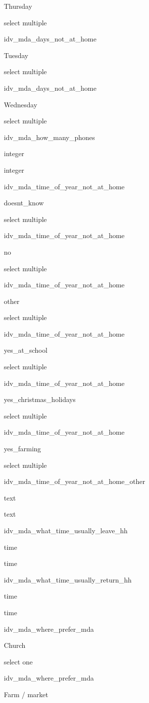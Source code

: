 \documentclass[]{article}
\begin{document}
Thursday

select multiple

idv\_mda\_days\_not\_at\_home

Tuesday

select multiple

idv\_mda\_days\_not\_at\_home

Wednesday

select multiple

idv\_mda\_how\_many\_phones

integer

integer

idv\_mda\_time\_of\_year\_not\_at\_home

doesnt\_know

select multiple

idv\_mda\_time\_of\_year\_not\_at\_home

no

select multiple

idv\_mda\_time\_of\_year\_not\_at\_home

other

select multiple

idv\_mda\_time\_of\_year\_not\_at\_home

yes\_at\_school

select multiple

idv\_mda\_time\_of\_year\_not\_at\_home

yes\_christmas\_holidays

select multiple

idv\_mda\_time\_of\_year\_not\_at\_home

yes\_farming

select multiple

idv\_mda\_time\_of\_year\_not\_at\_home\_other

text

text

idv\_mda\_what\_time\_usually\_leave\_hh

time

time

idv\_mda\_what\_time\_usually\_return\_hh

time

time

idv\_mda\_where\_prefer\_mda

Church

select one

idv\_mda\_where\_prefer\_mda

Farm / market
\end{document}
